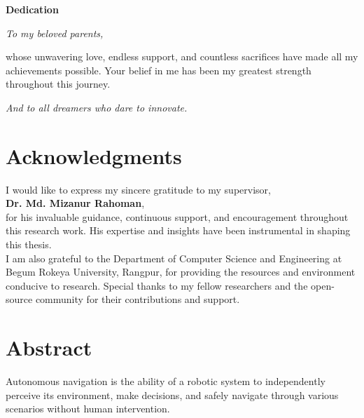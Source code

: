 \documentclass[12pt,oneside]{book}
\newcommand{\thesupervisor}{ Dr. Md. Mizanur Rahoman}
\begin{document}
\newpage
\thispagestyle{empty}
\vspace*{3cm}

\begin{center}
    {\Large \textbf{Dedication}}

    \vspace{2cm}

    \begin{minipage}{0.8\textwidth}
    \large
    \textit{To my beloved parents,}

    \vspace{0.5cm}

    whose unwavering love, endless support, and countless sacrifices have made all my achievements possible. Your belief in me has been my greatest strength throughout this journey.

    \vspace{0.5cm}

    \textit{And to all dreamers who dare to innovate.}
    \end{minipage}
\end{center}
\clearpage

\chapter*{Acknowledgments}
I would like to express my sincere gratitude to my supervisor,\vspace{0.5cm}\\ \textbf{\thesupervisor},\\ for his invaluable guidance, continuous support, and encouragement throughout this research work. His expertise and insights have been instrumental in shaping this thesis.
\vspace{1cm}\\I am also grateful to the Department of Computer Science and Engineering at Begum Rokeya University, Rangpur, for providing the resources and environment conducive to research. Special thanks to my fellow researchers and the open-source community for their contributions and support.

\clearpage

\chapter*{Abstract}
Autonomous navigation is the ability of a robotic system to independently perceive its environment, make decisions, and safely navigate through various scenarios without human intervention.
\end{document}
